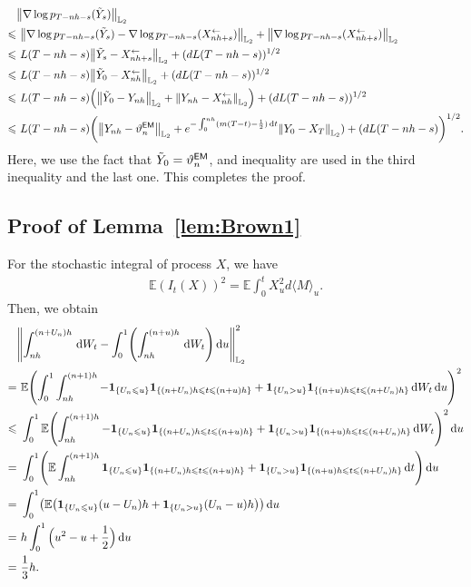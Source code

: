 \begin{align*}
    &\l|\nabla\log p_{T-nh-s}(\tilde{Y}_s)\r|_{\Ltwo}\\
    \leqslant&\,\,\l|\nabla\log p_{T-nh-s}(\tilde{Y}_s)-\nabla\log p_{T-nh-s}(X_{nh+s}^{\leftarrow})\r|_{\Ltwo}+\l|\nabla\log p_{T-nh-s}(X_{nh+s}^{\leftarrow})\r|_{\Ltwo}\\
    \leqslant& \,\,L(T-nh-s)\l|\tilde{Y}_s-X_{nh+s}^{\leftarrow}\r|_{\Ltwo}+(dL(T-nh-s))^{1/2}\\
    \leqslant&\,\,L(T-nh-s)\l|\tilde{Y}_0-X_{nh}^{\leftarrow}\r|_{\Ltwo}+(dL(T-nh-s))^{1/2}\\
    \leqslant&\,\,L(T-nh-s)\left(\l|\tilde{Y}_0-Y_{nh}\r|_{\Ltwo}+\l|Y_{nh}-X_{nh}^{\leftarrow}\r|_{\Ltwo}\right)+(dL(T-nh-s))^{1/2}\\
    \leqslant& \,\,L(T-nh-s)\left(\l|Y_{nh}-\vartheta_n^{\sf EM}\r|_{\Ltwo}+e^{-\int_0^{nh}(m(T-t)-\frac{1}{2})\rmd t}\l|Y_0-X_T\r|_{\Ltwo})+(dL(T-nh-s)\right)^{1/2}.
\end{align*}
Here, we use the fact that $\tilde{Y}_0=\vartheta_n^{\sf EM}$, and  inequality are used in the third inequality and the last one. This completes the proof.

\subsection{Proof of Lemma~\ref{lem:Brown1}}
For the stochastic integral of process $X$, we have
\begin{align*}
    \mathbb{E}(I_t(X))^2=\mathbb{E}\int_0^tX_u^2d\langle M \rangle_u.
\end{align*}
Then, we obtain 
\begin{align*}
    &\left\lVert\int_{nh}^{(n+U_n)h}\rmd W_t-\int_0^1\left(\int_{nh}^{(n+u)h}\rmd W_t\right)\rmd u\right\rVert_{\Ltwo}^2\\
    =&\,\,\mathbb{E}\left(\int_0^1\int_{nh}^{(n+1)h}-\textbf{1}_{\{U_n\leqslant u\}}\textbf{1}_{\{(n+U_n)h\leqslant t\leqslant (n+u)h\}}+\textbf{1}_{\{U_n>u\}}\textbf{1}_{\{(n+u)h\leqslant t\leqslant (n+U_n)h\}}\rmd W_t\rmd u\right)^2\\
    \leqslant&\,\,\int_0^1\mathbb{E}\left(\int_{nh}^{(n+1)h}-\textbf{1}_{\{U_n\leqslant u\}}\textbf{1}_{\{(n+U_n)h\leqslant t\leqslant (n+u)h\}}+\textbf{1}_{\{U_n>u\}}\textbf{1}_{\{(n+u)h\leqslant t\leqslant (n+U_n)h\}}\rmd W_t\right)^2\rmd u\\
    = & \,\,\int_0^1\left(\mathbb{E}\int_{nh}^{(n+1)h}\textbf{1}_{\{U_n\leqslant u\}}\textbf{1}_{\{(n+U_n)h\leqslant t\leqslant (n+u)h\}}+\textbf{1}_{\{U_n>u\}}\textbf{1}_{\{(n+u)h\leqslant t\leqslant(n+U_n)h\}}\rmd t\right)\rmd u\\
    = & \,\,\int_0^1\left(\mathbb{E}\left(\textbf{1}_{\{U_n\leqslant u\}}(u-U_n)h+\textbf{1}_{\{U_n>u\}}(U_n-u)h\right)\right)\rmd u\\
    =&\,\,h\int_0^1\Big(u^2-u+\dfrac{1}{2}\Big)\rmd u\\
    =&\,\,\dfrac{1}{3}h.
\end{align*}

